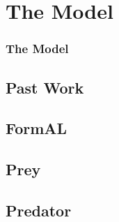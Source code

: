 \section{The Model}

\frame
{
	\frametitle{The Model}
}

\subsection{Past Work}
\subsection{FormAL}
\subsection{Prey}
\subsection{Predator}

